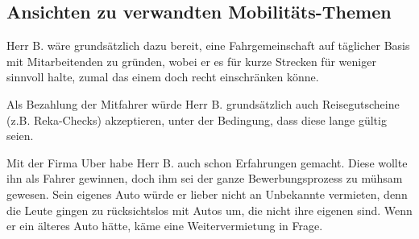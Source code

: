 \documentclass[11pt,a4paper]{scrartcl}
\begin{document}
\subsection{Ansichten zu verwandten Mobilitäts-Themen}

Herr B. wäre grundsätzlich dazu bereit, eine Fahrgemeinschaft auf täglicher Basis mit Mitarbeitenden zu gründen, wobei er es für kurze Strecken für weniger sinnvoll halte, zumal das einem doch recht einschränken könne. \cite[Zeilen 191-195]{interview}

Als Bezahlung der Mitfahrer würde Herr B. grundsätzlich auch Reisegutscheine (z.B. Reka-Checks) akzeptieren, unter der Bedingung, dass diese lange gültig seien. \cite[Zeilen 196-198]{interview}

Mit der Firma Uber habe Herr B. auch schon Erfahrungen gemacht. Diese wollte ihn als Fahrer gewinnen, doch ihm sei der ganze Bewerbungsprozess zu mühsam gewesen. \cite[Zeilen 199-204]{interview}
Sein eigenes Auto würde er lieber nicht an Unbekannte vermieten, denn die Leute gingen zu rücksichtslos mit Autos um, die nicht ihre eigenen sind. Wenn er ein älteres Auto hätte, käme eine Weitervermietung in Frage. \cite[Zeilen 186-190]{interview}

\renewcommand{\refname}{Quellen}


\end{document}
